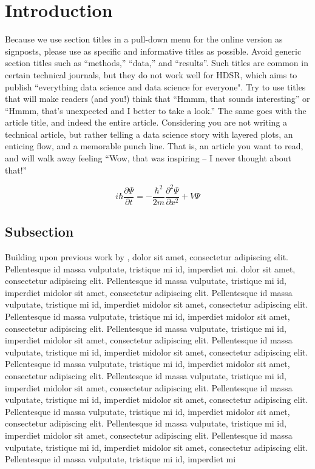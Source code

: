\documentclass[]{hdsr}
\begin{document}
\section{Introduction}
\label{sec1}
Because we use section titles in a pull-down menu for the online version as signposts, please use as specific and informative titles as possible. Avoid generic section titles such as ``methods,'' ``data,'' and ``results''. Such titles are common in certain technical journals, but they do not work well for HDSR, which aims to publish ``everything data science and data science for everyone". Try to use titles that will make readers (and you!) think that ``Hmmm, that sounds interesting'' or ``Hmmm, that's unexpected and I better to take a look.''   The same goes with the article title, and indeed the entire article.  Considering you are not writing a technical article, but rather telling a data science story with layered plots, an enticing flow, and a memorable punch line. That is, an article you want to read, and will walk away feeling ``Wow, that was inspiring -- I never thought about that!'' 

\begin{equation}
    i\hbar \frac{\partial \Psi}{\partial t} = -\frac{\hbar^2}{2m}
\frac{\partial^2 \Psi}{\partial x^2} + V \Psi
\end{equation}


\subsection{Subsection}
Building upon previous work by \cite{2020.03.27.20043752},  dolor sit amet, consectetur adipiscing elit. Pellentesque id massa vulputate, tristique mi id, imperdiet mi. dolor sit amet, consectetur adipiscing elit. Pellentesque id massa vulputate, tristique mi id, imperdiet midolor sit amet, consectetur adipiscing elit. Pellentesque id massa vulputate, tristique mi id, imperdiet midolor sit amet, consectetur adipiscing elit. Pellentesque id massa vulputate, tristique mi id, imperdiet midolor sit amet, consectetur adipiscing elit. Pellentesque id massa vulputate, tristique mi id, imperdiet midolor sit amet, consectetur adipiscing elit. Pellentesque id massa vulputate, tristique mi id, imperdiet midolor sit amet, consectetur adipiscing elit. Pellentesque id massa vulputate, tristique mi id, imperdiet midolor sit amet, consectetur adipiscing elit. Pellentesque id massa vulputate, tristique mi id, imperdiet midolor sit amet, consectetur adipiscing elit. Pellentesque id massa vulputate, tristique mi id, imperdiet midolor sit amet, consectetur adipiscing elit. Pellentesque id massa vulputate, tristique mi id, imperdiet midolor sit amet, consectetur adipiscing elit. Pellentesque id massa vulputate, tristique mi id, imperdiet midolor sit amet, consectetur adipiscing elit. Pellentesque id massa vulputate, tristique mi id, imperdiet midolor sit amet, consectetur adipiscing elit. Pellentesque id massa vulputate, tristique mi id, imperdiet mi
\end{document}
